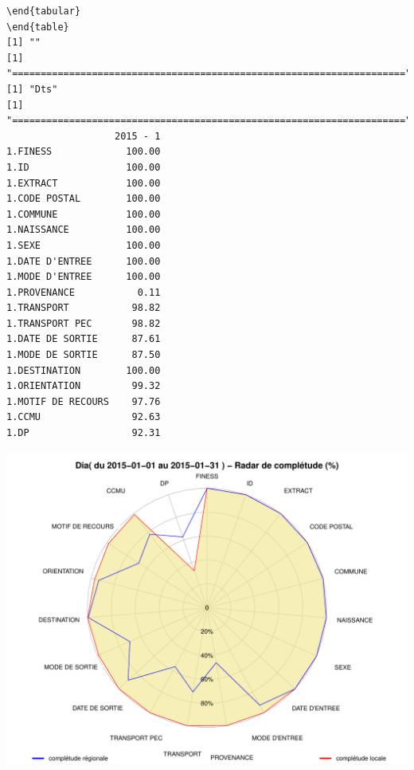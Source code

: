 \documentclass[]{article}
\begin{document}
\begin{verbatim}
\end{tabular} 
\end{table} 
[1] ""
[1] "====================================================================="
[1] "Dts"
[1] "====================================================================="
                   2015 - 1
1.FINESS             100.00
1.ID                 100.00
1.EXTRACT            100.00
1.CODE POSTAL        100.00
1.COMMUNE            100.00
1.NAISSANCE          100.00
1.SEXE               100.00
1.DATE D'ENTREE      100.00
1.MODE D'ENTREE      100.00
1.PROVENANCE           0.11
1.TRANSPORT           98.82
1.TRANSPORT PEC       98.82
1.DATE DE SORTIE      87.61
1.MODE DE SORTIE      87.50
1.DESTINATION        100.00
1.ORIENTATION         99.32
1.MOTIF DE RECOURS    97.76
1.CCMU                92.63
1.DP                  92.31
\end{verbatim}

\includegraphics{completude_files/figure-latex/finess-5.pdf}
\end{document}
